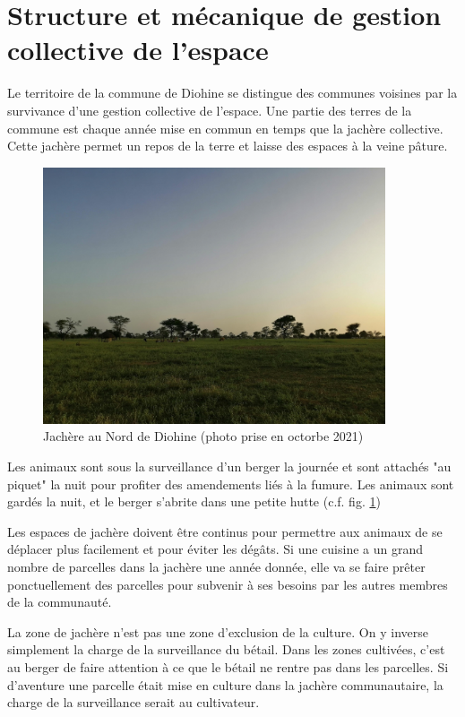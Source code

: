 \section{Structure et mécanique de gestion collective de l'espace}

Le territoire de la commune de Diohine se distingue des communes voisines par la survivance d'une gestion collective de l'espace. Une partie des terres de la commune est chaque année mise en commun en temps que la jachère collective. Cette jachère permet un repos de la terre et laisse des espaces à la veine pâture.

\begin{figure}
  \begin{center}
    \includegraphics[width=0.9\textwidth]{img/jachere.jpg}
  \end{center}
  \caption{Jachère au Nord de Diohine (photo prise en octorbe 2021)}
  \label{fig:photoJachere}
\end{figure}

Les animaux sont sous la surveillance d'un berger la journée et sont attachés "au piquet" la nuit pour profiter des amendements liés à la fumure. Les animaux sont gardés la nuit, et le berger s'abrite dans une petite hutte (c.f. fig. \ref{fig:photoJachere})

Les espaces de jachère doivent être continus pour permettre aux animaux de se déplacer plus facilement et pour éviter les dégâts. Si une cuisine a un grand nombre de parcelles dans la jachère une année donnée, elle va se faire prêter ponctuellement des parcelles pour subvenir à ses besoins par les autres membres de la communauté.

La zone de jachère n'est pas une zone d'exclusion de la culture. On y inverse simplement la charge de la surveillance du bétail. Dans les zones cultivées, c'est au berger de faire attention à ce que le bétail ne rentre pas dans les parcelles. Si d'aventure une parcelle était mise en culture dans la jachère communautaire, la charge de la surveillance serait au cultivateur.

